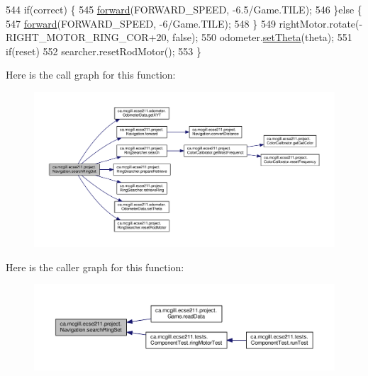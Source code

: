 \begin{DoxyCode}
544     \textcolor{keywordflow}{if}(correct) \{
545       \hyperlink{classca_1_1mcgill_1_1ecse211_1_1project_1_1_navigation_a7c66610c5b7496ddb35d342ab2cd3f08}{forward}(FORWARD\_SPEED, -6.5/Game.TILE);
546     \}\textcolor{keywordflow}{else} \{
547       \hyperlink{classca_1_1mcgill_1_1ecse211_1_1project_1_1_navigation_a7c66610c5b7496ddb35d342ab2cd3f08}{forward}(FORWARD\_SPEED, -6/Game.TILE);
548     \}
549     rightMotor.rotate(-RIGHT\_MOTOR\_RING\_COR+20, \textcolor{keyword}{false});
550     odometer.\hyperlink{classca_1_1mcgill_1_1ecse211_1_1odometer_1_1_odometer_data_a419b8f07c2c5374411c8e62298e9a402}{setTheta}(theta);
551     \textcolor{keywordflow}{if}(reset)
552       searcher.resetRodMotor();
553   \}
\end{DoxyCode}
Here is the call graph for this function\+:
\nopagebreak
\begin{figure}[H]
\begin{center}
\leavevmode
\includegraphics[width=350pt]{classca_1_1mcgill_1_1ecse211_1_1project_1_1_navigation_a1a808e665b8dd5b8e79b0580724d239c_cgraph}
\end{center}
\end{figure}
Here is the caller graph for this function\+:
\nopagebreak
\begin{figure}[H]
\begin{center}
\leavevmode
\includegraphics[width=350pt]{classca_1_1mcgill_1_1ecse211_1_1project_1_1_navigation_a1a808e665b8dd5b8e79b0580724d239c_icgraph}
\end{center}
\end{figure}
\mbox{\label{classca_1_1mcgill_1_1ecse211_1_1project_1_1_navigation_ae8530d181ffd790ff9dea5eeab54b1a1}} 

